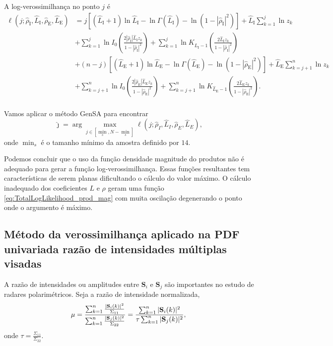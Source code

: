 A log-verossimilhança no ponto $j$ é
\begin{equation}\label{eq:TotalLogLikelihood_prod_mag}
\begin{split}
\ell(j;\widehat{\rho}_\text{I}, \widehat{L}_\text{I}, \widehat{\rho}_\text{E}, \widehat{L}_\text{E})&
=j\left[(\widehat{L}_\text{I}+1)\ln \widehat{L}_\text{I}-\ln\Gamma(\widehat{L}_\text{I})-\ln(1-|\widehat{\rho}_\text{I}|^2)\right]
+\widehat{L}_\text{I}\sum_{k=1}^{j} \ln z_k\\
&+\sum_{k=1}^{j}\ln I_0\left(\frac{2|\widehat{\rho}_\text{I}|\widehat{L}_\text{I}z_k}{1-|\widehat{\rho}_\text{I}|^2}\right)
+ \sum_{k=1}^{j}\ln K_{\widehat{L}_\text{I}-1}\left(\frac{2\widehat{L}_\text{I}z_k}{1-|\widehat{\rho}_\text{I}|^2}\right)\\
&+(n-j)\left[(\widehat{L}_\text{E}+1)\ln \widehat{L}_\text{E}-\ln\Gamma(\widehat{L}_\text{E})-\ln(1-|\widehat{\rho}_\text{E}|^2)\right]
+\widehat{L}_\text{E}\sum_{k=j+1}^{n} \ln z_k\\
&+\sum_{k=j+1}^{n}\ln I_0\left(\frac{2|\widehat{\rho}_\text{E}|\widehat{L}_\text{E}z_k}{1-|\widehat{\rho}_\text{E}|^2}\right)
+ \sum_{k=j+1}^{n}\ln K_{\widehat{L}_\text{E}-1}\left(\frac{2\widehat{L}_\text{E}z_k}{1-|\widehat{\rho}_\text{E}|^2}\right).\\
\end{split}
\end{equation}

Vamos aplicar o método GenSA para encontrar
$$
\widehat{\jmath}= \arg\max\limits_{j\in [\min_s,N-\min_s]}\ell(j;\widehat{\rho}_I, \widehat{L}_I,\widehat{\rho}_E, \widehat{L}_E),
$$ 
onde $\min_s$ é o tamanho mínimo da amostra definido por $14$.

Podemos concluir que o uso da função densidade magnitude do produtos não é adequado para gerar a função log-verossimilhança. Essas funções resultantes tem características de serem planas dificultando o cálculo do valor máximo. O cálculo inadequado dos coeficientes $L$  e $\rho$ geram uma função \eqref{eq:TotalLogLikelihood_prod_mag} com muita oscilação degenerando o ponto onde o argumento é máximo.


\subsection{Método da verossimilhança aplicado na PDF univariada razão de intensidades múltiplas visadas}
A razão de intensidades ou amplitudes entre $\mathbf{S}_i$ e $\mathbf{S}_j$ são importantes no estudo de radares polarimétricos. Seja a razão de intensidade normalizada,
\begin{equation}\label{eq:razao_intensidades}
 \mu=\frac{\sum_{k=1}^{n}\frac{|\mathbf{S}_i(k)|^2}{\Sigma_{11}}}{\sum_{k=1}^{n}\frac{|\mathbf{S}_j(k)|^2}{\Sigma_{22}}}=\frac{\sum_{k=1}^{n}|\mathbf{S}_i(k)|^2}{\tau\sum_{k=1}^{n}|\mathbf{S}_j(k)|^2},\\
\end{equation}
onde $\tau=\frac{\Sigma_{11}}{\Sigma_{22}}$.
  
